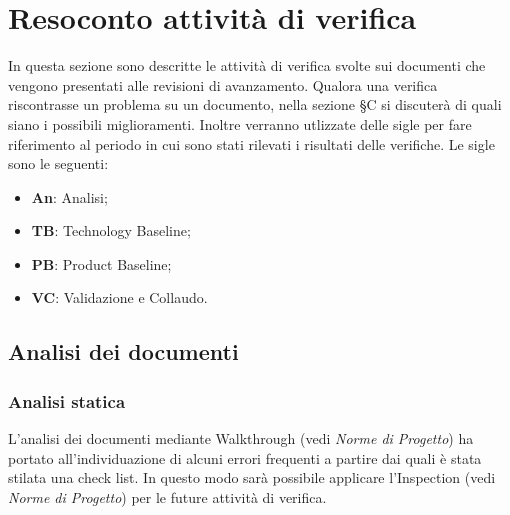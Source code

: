 \section{Resoconto attività di verifica}
In questa sezione sono descritte le attività di verifica svolte sui documenti che vengono presentati alle revisioni di avanzamento. Qualora una verifica riscontrasse un problema su un documento, nella sezione \S C si discuterà di quali siano i possibili miglioramenti.
Inoltre verranno utlizzate delle sigle per fare riferimento al periodo in cui sono stati rilevati i risultati delle verifiche. Le sigle sono le seguenti:
\begin{itemize}
\item \textbf{An}: Analisi;
\item \textbf{TB}: Technology Baseline;
\item \textbf{PB}: Product Baseline;
\item \textbf{VC}: Validazione e Collaudo. 
\end{itemize}

\subsection{Analisi dei documenti}
\subsubsection{Analisi statica}
L'analisi dei documenti mediante Walkthrough (vedi \textit{Norme di Progetto}) ha portato all'individuazione di alcuni errori frequenti a partire dai quali è stata stilata una check list. In questo modo sarà possibile applicare l’Inspection (vedi \textit{Norme di Progetto}) per le future attività di verifica.


